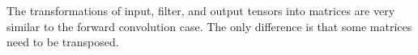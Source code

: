 The transformations of input, filter, and output tensors into matrices are very similar to
the forward convolution case.
The only difference is that some matrices need to be transposed.


    





    

